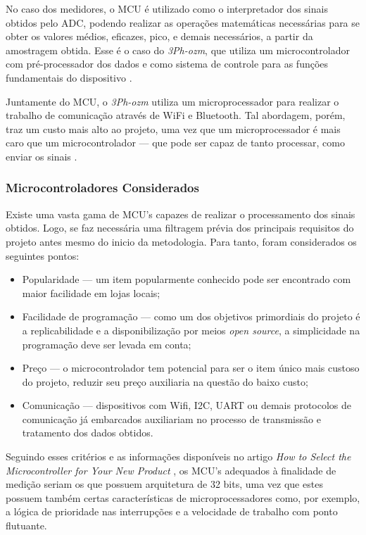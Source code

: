 No caso dos medidores, o \gls{MCU} é utilizado como o interpretador dos sinais obtidos pelo \gls{ADC}, podendo realizar as operações matemáticas necessárias para se obter os valores médios, eficazes, pico, e demais necessários, a partir da amostragem obtida. Esse é o caso do \textit{3Ph-ozm}, que utiliza um microcontrolador com pré-processador dos dados e como sistema de controle para as funções fundamentais do dispositivo \cite{3ph-ozm}.

Juntamente do \gls{MCU}, o \textit{3Ph-ozm} utiliza um microprocessador para realizar o trabalho de comunicação através de WiFi e Bluetooth.
Tal abordagem, porém, traz um custo mais alto ao projeto, uma vez que um microprocessador é mais caro que um microcontrolador --- que pode ser capaz de tanto processar, como enviar os sinais \cite{uCdiff}.

\subsubsection{Microcontroladores Considerados} \label{subsubsec:uc-disp}

Existe uma vasta gama de \gls{MCU}'s capazes de realizar o processamento dos sinais obtidos. Logo, se faz necessária uma filtragem prévia dos principais requisitos do projeto antes mesmo do inicio da metodologia.
Para tanto, foram considerados os seguintes pontos:

\begin{itemize}
    \item Popularidade --- um item popularmente conhecido pode ser encontrado com maior facilidade em lojas locais;
    \item Facilidade de programação --- como um dos objetivos primordiais do projeto é a replicabilidade e a disponibilização por meios \textit{open source}, a simplicidade na programação deve ser levada em conta;
    \item Preço --- o microcontrolador tem potencial para ser o item único mais custoso do projeto, reduzir seu preço auxiliaria na questão do baixo custo;
    \item Comunicação --- dispositivos com Wifi, I2C, UART ou demais protocolos de comunicação já embarcados auxiliariam no processo de transmissão e tratamento dos dados obtidos.
\end{itemize}

Seguindo esses critérios e as informações disponíveis no artigo \textit{How to Select the Microcontroller for Your New Product} \cite{select_uC}, os \gls{MCU}'s adequados à finalidade de medição seriam os que possuem arquitetura de 32 bits, uma vez que estes possuem também certas características de microprocessadores como, por exemplo, a lógica de prioridade nas interrupções e a velocidade de trabalho com ponto flutuante.

